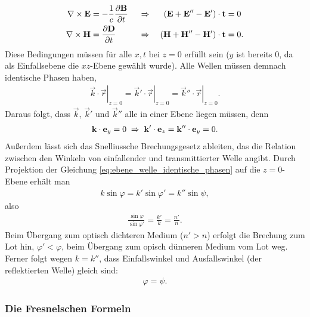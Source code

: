 \begin{align}
    \label{eq:ebene_welle_RB_stetige_tangentialkomponenten}
    \begin{aligned}
        \nabla\times \mathbf{E} & = -\frac{1}{c}\frac{\partial\mathbf{B}}{\partial t} &  & \;\Rightarrow\; & \left(\mathbf{E}+\mathbf{E}''-\mathbf{E}'\right)\cdot \mathbf{t} & =0  \\
        \nabla\times \mathbf{H} & =\frac{\partial\mathbf{D}}{\partial t}              &  & \;\Rightarrow\; & \left(\mathbf{H}+\mathbf{H}''-\mathbf{H}'\right)\cdot \mathbf{t} & =0.
    \end{aligned}
\end{align}
Diese Bedingungen müssen für alle $x,t$ bei $z=0$ erfüllt sein ($y$ ist bereits 0, da als Einfallsebene die $xz$-Ebene gewählt wurde). Alle Wellen müssen demnach identische Phasen haben,
\begin{align}
    \label{eq:ebene_welle_identische_phasen}
    \boxed{\left.\vec k\cdot\vec r\right|_{z=0}=\left.\vec k'\cdot\vec r\right|_{z=0}=\left.\vec k''\cdot\vec r\right|_{z=0}.}
\end{align}
Daraus folgt, dass $\vec k$, $\vec k'$ und $\vec k''$ alle in einer Ebene liegen müssen, denn
\begin{align*}
    \mathbf{k}\cdot \mathbf{e}_y=0 \;\Rightarrow\; \mathbf{k}'\cdot \mathbf{e}_z=\mathbf{k}''\cdot \mathbf{e}_y=0.
\end{align*}
Außerdem lässt sich das Snelliussche Brechungsgesetz ableiten, das die Relation zwischen den Winkeln von einfallender und transmittierter Welle angibt.
Durch Projektion der Gleichung \eqref{eq:ebene_welle_identische_phasen} auf die $z=0$-Ebene erhält man
\begin{align*}
    k \sin\varphi = k' \sin\varphi' = k''\sin\psi,
\end{align*}
also
\begin{align}
    \label{eq:snelliussches_brechungsgesetz}
    \boxed{\frac{\sin\varphi}{\sin\varphi'}=\frac{k'}{k}=\frac{n'}{n}.}
\end{align}
Beim Übergang zum optisch dichteren Medium ($n'>n$) erfolgt die Brechung zum Lot hin, $\varphi'<\varphi$, beim Übergang zum opisch dünneren Medium vom Lot weg.
Ferner folgt wegen $k=k''$, dass Einfallswinkel und Ausfallswinkel (der reflektierten Welle) gleich sind:
\begin{align*}
    \varphi=\psi.
\end{align*}



\subsubsection{Die Fresnelschen Formeln}

